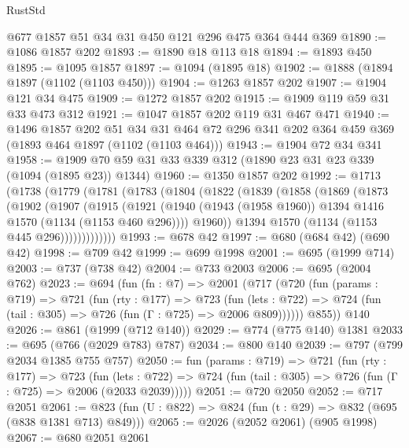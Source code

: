 \begin{lexlean}{RustStd}
\begin{coremodule}
{\begin{coremodule}
{{{{{{{{{    @677
    @1857
    @51
    @34
    @31
    @450
    @121
    @296
    @475
    @364
    @444
    @369
@1890 := @1086 @1857 @202
@1893 := @1890 @18 @113 @18
@1894 := @1893 @450
@1895 := @1095 @1857
@1897 := @1094 (@1895 @18)
@1902 := @1888 (@1894 @1897 (@1102 (@1103 @450)))
@1904 := @1263 @1857 @202
@1907 := @1904 @121 @34 @475
@1909 := @1272 @1857 @202
@1915 := @1909 @119 @59 @31 @33 @473 @312
@1921 := @1047 @1857 @202 @119 @31 @467 @471
@1940 := @1496
    @1857
    @202
    @51
    @34
    @31
    @464
    @72
    @296
    @341
    @202
    @364
    @459
    @369
    (@1893 @464 @1897 (@1102 (@1103 @464)))
@1943 := @1904 @72 @34 @341
@1958 := @1909 @70 @59 @31 @33 @339 @312 (@1890 @23 @31 @23 @339 (@1094 (@1895 @23)) @1344)
@1960 := @1350 @1857 @202
@1992 := @1713
    (@1738
      (@1779
        (@1781
          (@1783
            (@1804
              (@1822
                (@1839
                  (@1858
                    (@1869
                      (@1873
                        (@1902
                          (@1907
                            (@1915
                              (@1921
                                (@1940
                                  (@1943 (@1958 @1960))
                                  @1394
                                  @1416
                                  @1570
                                  (@1134 (@1153 @460 @296))))
                              @1960))
                          @1394
                          @1570
                          (@1134 (@1153 @445 @296)))))))))))))
@1993 := @678 @42
@1997 := @680 (@684 @42) (@690 @42)
@1998 := @709 @42
@1999 := @699 @1998
@2001 := @695 (@1999 @714)
@2003 := @737 (@738 @42)
@2004 := @733 @2003
@2006 := @695 (@2004 @762)
@2023 := @694
    (fun (fn : @7) =>
    @2001
      (@717
        (@720
          (fun (params : @719) =>
          @721
            (fun (rty : @177) =>
            @723
              (fun (lets : @722) =>
              @724 (fun (tail : @305) => @726 (fun (Γ : @725) => @2006 @809))))))
        @855))
    @140
@2026 := @861 (@1999 (@712 @140))
@2029 := @774 (@775 @140) @1381
@2033 := @695 (@766 (@2029 @783) @787)
@2034 := @800 @140
@2039 := @797 (@799 @2034 @1385 @755 @757)
@2050 := fun (params : @719) =>
  @721
    (fun (rty : @177) =>
    @723
      (fun (lets : @722) =>
      @724 (fun (tail : @305) => @726 (fun (Γ : @725) => @2006 (@2033 @2039)))))
@2051 := @720 @2050
@2052 := @717 @2051
@2061 := @823 (fun (U : @822) => @824 (fun (t : @29) => @832 (@695 (@838 @1381 @713) @849)))
@2065 := @2026 (@2052 @2061) (@905 @1998)
@2067 := @680 @2051 @2061
}}}}}}}}}
\end{coremodule}}
\end{coremodule}
\end{lexlean}
